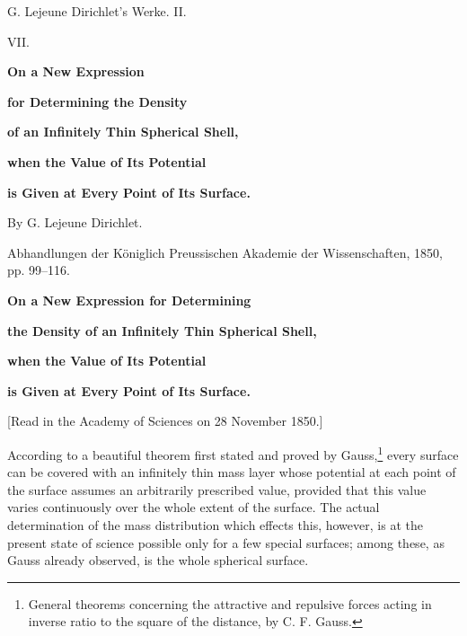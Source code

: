 \documentclass[11pt]{article}
\begin{document}
\begin{center}
{\Large G. Lejeune Dirichlet's Werke. II.}\par\vspace{1.2em}
{\Large VII.}\par\vspace{0.5em}
{\LARGE \textbf{On a New Expression}}\par
{\LARGE \textbf{for Determining the Density}}\par
{\LARGE \textbf{of an Infinitely Thin Spherical Shell,}}\par
{\LARGE \textbf{when the Value of Its Potential}}\par
{\LARGE \textbf{is Given at Every Point of Its Surface.}}\par\vspace{1em}
{\large By G. Lejeune Dirichlet.}\par\vspace{0.5em}
{\small Abhandlungen der Königlich Preussischen Akademie der Wissenschaften, 1850, pp. 99--116.}
\end{center}

\begin{center}
{\large \textbf{On a New Expression for Determining}}\par
{\large \textbf{the Density of an Infinitely Thin Spherical Shell,}}\par
{\large \textbf{when the Value of Its Potential}}\par
{\large \textbf{is Given at Every Point of Its Surface.}}\par
{\small [Read in the Academy of Sciences on 28 November 1850.\footnotemark]}
\end{center}

According to a beautiful theorem first stated and proved by Gauss,\footnote{General theorems concerning the attractive and repulsive forces acting in inverse ratio to the square of the distance, by C. F. Gauss.} every surface can be covered with an infinitely thin mass layer whose potential at each point of the surface assumes an arbitrarily prescribed value, provided that this value varies continuously over the whole extent of the surface. The actual determination of the mass distribution which effects this, however, is at the present state of science possible only for a few special surfaces; among these, as Gauss already observed, is the whole spherical surface.
\end{document}
